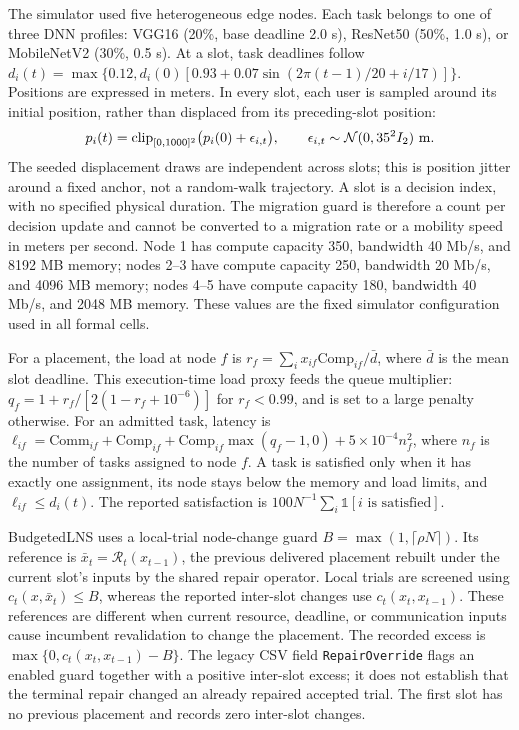 \documentclass[preprint,12pt]{elsarticle}
\begin{document}
The simulator used five heterogeneous edge nodes. Each task belongs to
one of three DNN profiles: VGG16 (20\%, base deadline 2.0 s), ResNet50
(50\%, 1.0 s), or MobileNetV2 (30\%, 0.5 s). At a slot, task deadlines
follow \(d_i(t)=\max\{0.12,d_i(0)[0.93+0.07\sin(2\pi(t-1)/20+i/17)]\}\).
Positions are expressed in meters. In every slot, each user is sampled
around its initial position, rather than displaced from its preceding-slot
position:
\begin{equation}
 p_i(t)=\operatorname{clip}_{[0,1000]^2}
 \bigl(p_i(0)+\epsilon_{i,t}\bigr),\qquad
 \epsilon_{i,t}\sim\mathcal N(0,35^2 I_2)\ {\rm m}.
\end{equation}
The seeded displacement draws are independent across slots; this is
position jitter around a fixed anchor, not a random-walk trajectory. A slot
is a decision index, with no specified physical duration. The migration
guard is therefore a count per decision update and cannot be converted to
a migration rate or a mobility speed in meters per second. Node 1 has compute capacity 350,
bandwidth 40 Mb/s, and 8192 MB memory; nodes 2--3 have compute capacity
250, bandwidth 20 Mb/s, and 4096 MB memory; nodes 4--5 have compute
capacity 180, bandwidth 40 Mb/s, and 2048 MB memory. These values are
the fixed simulator configuration used in all formal cells.

For a placement, the load at node \(f\) is
\(r_f=\sum_i x_{if}\mathrm{Comp}_{if}/\bar d\), where \(\bar d\) is the
mean slot deadline. This execution-time load proxy feeds the queue multiplier:
\(q_f=1+r_f/[2(1-r_f+10^{-6})]\) for \(r_f<0.99\), and is set to a large
penalty otherwise. For an admitted task, latency is
\(\ell_{if}=\mathrm{Comm}_{if}+\mathrm{Comp}_{if}+\mathrm{Comp}_{if}\max(q_f-1,0)+5\times10^{-4}n_f^2\),
where \(n_f\) is the number of tasks assigned to node \(f\). A task is
satisfied only when it has exactly one assignment, its node stays below
the memory and load limits, and \(\ell_{if}\le d_i(t)\). The reported
satisfaction is \(100N^{-1}\sum_i\mathbb{1}[i\text{ is satisfied}]\).

BudgetedLNS uses a local-trial node-change guard
\(B=\max(1,\lceil\rho N\rceil)\). Its reference is
\(\bar x_t=\mathcal R_t(x_{t-1})\), the previous delivered placement
rebuilt under the current slot's inputs by the shared repair operator.
Local trials are screened using \(c_t(x,\bar x_t)\le B\), whereas the
reported inter-slot changes use \(c_t(x_t,x_{t-1})\). These references
are different when current resource, deadline, or communication inputs
cause incumbent revalidation to change the placement. The recorded excess
is
\(\max\{0,c_t(x_t,x_{t-1})-B\}\). The legacy CSV field
\texttt{RepairOverride} flags an enabled guard together with a positive
inter-slot excess; it does not establish that the terminal repair changed
an already repaired accepted trial. The first slot has no previous
placement and records zero inter-slot changes.
\end{document}
